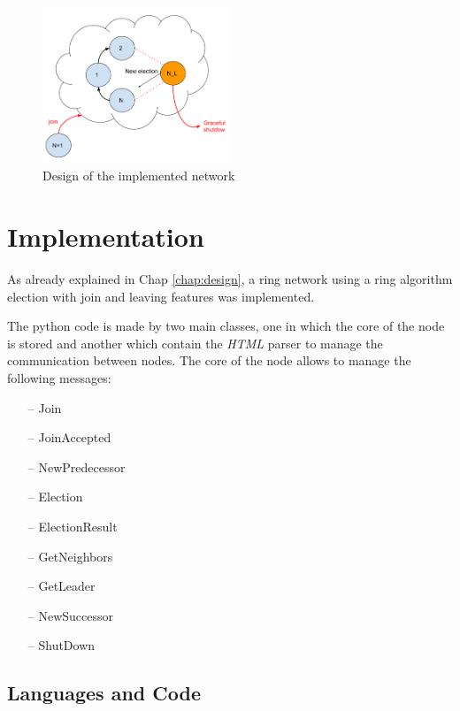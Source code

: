 \documentclass[11pt,conference]{IEEEtran}
\begin{document}
\begin{figure}[h!]
  \centering
    \includegraphics[width=0.5\textwidth]{design}
    \caption{Design of the implemented network}
    \label{fig:design}
\end{figure}


\section{Implementation}
As already explained in Chap \ref{chap:design}, a ring network using a ring algorithm election with join and leaving features was implemented.

The python code is made by two main classes, one in which the core of the node is stored and another which contain the \textit{HTML} parser to manage the communication between nodes. The core of the node allows to manage the following messages:
\begin{itemize}
\item[--] Join
\item[--] JoinAccepted
\item[--] NewPredecessor
\item[--] Election
\item[--] ElectionResult
\item[--] GetNeighbors
\item[--] GetLeader
\item[--] NewSuccessor 
\item[--] ShutDown
\end{itemize}


\subsection{Languages and Code}
\end{document}
